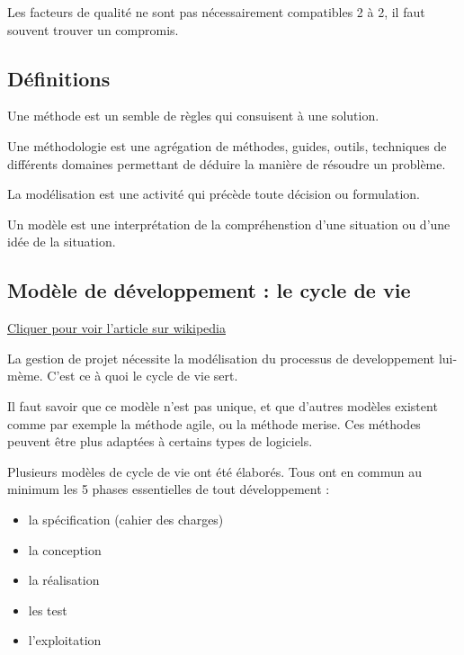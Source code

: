Les facteurs de qualité ne sont pas nécessairement compatibles 2 à 2, il
faut souvent trouver un compromis.

\hypertarget{duxe9finitions}{%
\subsection{Définitions}\label{duxe9finitions}}

Une méthode est un semble de règles qui consuisent à une solution.

Une méthodologie est une agrégation de méthodes, guides, outils,
techniques de différents domaines permettant de déduire la manière de
résoudre un problème.

La modélisation est une activité qui précède toute décision ou
formulation.

Un modèle est une interprétation de la compréhenstion d'une situation ou
d'une idée de la situation.

\hypertarget{moduxe8le-de-duxe9veloppement-le-cycle-de-vie}{%
\subsection{Modèle de développement : le cycle de
vie}\label{moduxe8le-de-duxe9veloppement-le-cycle-de-vie}}

\href{https://fr.wikipedia.org/wiki/Cycle_de_d\%C3\%A9veloppement_(logiciel)}{Cliquer pour voir
l'article sur wikipedia}

La gestion de projet nécessite la modélisation du processus de
developpement lui-mème. C'est ce à quoi le cycle de vie sert.

Il faut savoir que ce modèle n'est pas unique, et que d'autres modèles
existent comme par exemple la méthode agile, ou la méthode merise. Ces
méthodes peuvent être plus adaptées à certains types de logiciels.

Plusieurs modèles de cycle de vie ont été élaborés. Tous ont en commun
au minimum les 5 phases essentielles de tout développement :

\begin{itemize}
\tightlist
\item
  la spécification (cahier des charges)
\item
  la conception
\item
  la réalisation
\item
  les test
\item
  l'exploitation
\end{itemize}

